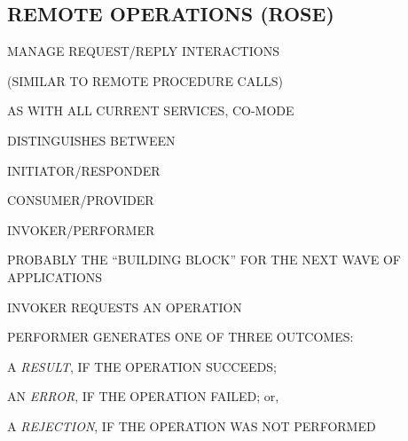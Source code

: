 \begin{bwslide}
\part*	{REMOTE OPERATIONS (ROSE)}\bf

\begin{nrtc}
\item	MANAGE REQUEST/REPLY INTERACTIONS
    \begin{nrtc}
    \item	(SIMILAR TO REMOTE PROCEDURE CALLS)
    \end{nrtc}

\item	AS WITH ALL CURRENT SERVICES, CO-MODE

\item	DISTINGUISHES BETWEEN
    \begin{nrtc}
    \item	INITIATOR/RESPONDER

    \item	CONSUMER/PROVIDER

    \item	INVOKER/PERFORMER
    \end{nrtc}
\item	PROBABLY THE ``BUILDING BLOCK'' FOR THE NEXT WAVE OF APPLICATIONS
\end{nrtc}
\end{bwslide}


\begin{bwslide}

\begin{nrtc}
\item	INVOKER REQUESTS AN OPERATION

\item	PERFORMER GENERATES ONE OF THREE OUTCOMES:
    \begin{nrtc}
    \item       A \emph{RESULT}, IF THE OPERATION SUCCEEDS;

    \item       AN \emph{ERROR}, IF THE OPERATION FAILED; or,

    \item       A \emph{REJECTION}, IF THE OPERATION WAS NOT PERFORMED
    \end{nrtc}
\end{nrtc}
\end{bwslide}




